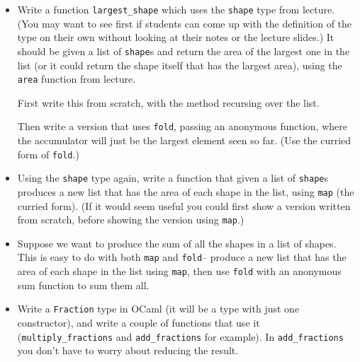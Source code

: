 \documentclass[12pt]{article}
\begin{document}
      \begin{itemize}

        \addtolength{\itemsep}{0mm}

        \item Write a function \texttt{largest\_shape} which uses the
              \texttt{shape} type from lecture.  (You may want to see first
              if students can come up with the definition of the type on
              their own without looking at their notes or the lecture
              slides.)  It should be given a list of \texttt{shape}s and
              return the area of the largest one in the list (or it could
              return the shape itself that has the largest area), using the
              \texttt{area} function from lecture.

              First write this from scratch, with the method recursing over
              the list.

              Then write a version that uses \texttt{fold}, passing an
              anonymous function, where the accumulator will just be the
              largest element seen so far.  (Use the curried form of
              \texttt{fold}.)

        \item Using the \texttt{shape} type again, write a function that
              given a list of \texttt{shape}s produces a new list that has
              the area of each shape in the list, using \texttt{map} (the
              curried form).  (If it would seem useful you could first show
              a version written from scratch, before showing the version
              using \texttt{map}.)

        \item Suppose we want to produce the sum of all the shapes in a list
              of shapes.  This is easy to do with both \texttt{map} and
              \texttt{fold}-- produce a new list that has the area of each
              shape in the list using \texttt{map}, then use \texttt{fold}
              with an anonymous sum function to sum them all.

        \item Write a \texttt{Fraction} type in OCaml (it will be a type
              with just one constructor), and write a couple of functions
              that use it (\texttt{multiply\_fractions} and
              \texttt{add\_fractions} for example).  In
              \texttt{add\_fractions} you don't have to worry about reducing
              the result.

      \end{itemize}
\end{document}
